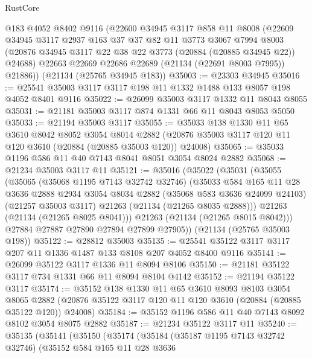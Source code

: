 \begin{lexlean}{RustCore}
\begin{coremodule}
    @183
    @4052
    @8402
    @9116
    (@22600
      @34945
      @3117
      @858
      @11
      @8008
      (@22609
        @34945
        @3117
        @2937
        @163
        @37
        @37
        @82
        @11
        @3773
        @3067
        @7994
        @8003
        (@20876 @34945 @3117 @22 @38 @22 @3773 (@20884 (@20885 @34945 @22)) @24688)
        @22663
        @22669
        @22686
        @22689
        (@21134 (@22691 @8003 @7995))
        @21886))
    (@21134 (@25765 @34945 @183))
@35003 := @23303 @34945
@35016 := @25541 @35003 @3117 @3117 @198 @11 @1332 @1488 @133 @8057 @198 @4052 @8401 @9116
@35022 := @26099 @35003 @3117 @1332 @11 @8043 @8055
@35031 := @21181 @35003 @3117 @874 @1331 @66 @11 @8043 @8053 @5050
@35033 := @21194 @35003 @3117
@35055 := @35033
    @138
    @1330
    @11
    @65
    @3610
    @8042
    @8052
    @3054
    @8014
    @2882
    (@20876 @35003 @3117 @120 @11 @120 @3610 (@20884 (@20885 @35003 @120)) @24008)
@35065 := @35033 @1196 @586 @11 @40 @7143 @8041 @8051 @3054 @8024 @2882
@35068 := @21234 @35003 @3117 @11
@35121 := @35016
    (@35022
      (@35031
        (@35055
          (@35065
            (@35068 @1195 @7143 @32742 @32746)
            (@35033
              @584
              @165
              @11
              @28
              @3636
              @2888
              @2934
              @3054
              @8034
              @2882
              (@35068 @583 @3636 @24099 @24103)
              (@21257 @35003 @3117)
              @21263
              (@21134 (@21265 @8035 @2888)))
            @21263
            (@21134 (@21265 @8025 @8041)))
          @21263
          (@21134 (@21265 @8015 @8042)))
        @27884
        @27887
        @27890
        @27894
        @27899
        @27905))
    (@21134 (@25765 @35003 @198))
@35122 := @28812 @35003
@35135 := @25541 @35122 @3117 @3117 @207 @11 @1336 @1487 @133 @8108 @207 @4052 @8400 @9116
@35141 := @26099 @35122 @3117 @1336 @11 @8094 @8106
@35150 := @21181 @35122 @3117 @734 @1331 @66 @11 @8094 @8104 @4142
@35152 := @21194 @35122 @3117
@35174 := @35152
    @138
    @1330
    @11
    @65
    @3610
    @8093
    @8103
    @3054
    @8065
    @2882
    (@20876 @35122 @3117 @120 @11 @120 @3610 (@20884 (@20885 @35122 @120)) @24008)
@35184 := @35152 @1196 @586 @11 @40 @7143 @8092 @8102 @3054 @8075 @2882
@35187 := @21234 @35122 @3117 @11
@35240 := @35135
    (@35141
      (@35150
        (@35174
          (@35184
            (@35187 @1195 @7143 @32742 @32746)
            (@35152
              @584
              @165
              @11
              @28
              @3636

\end{coremodule}
\end{lexlean}
